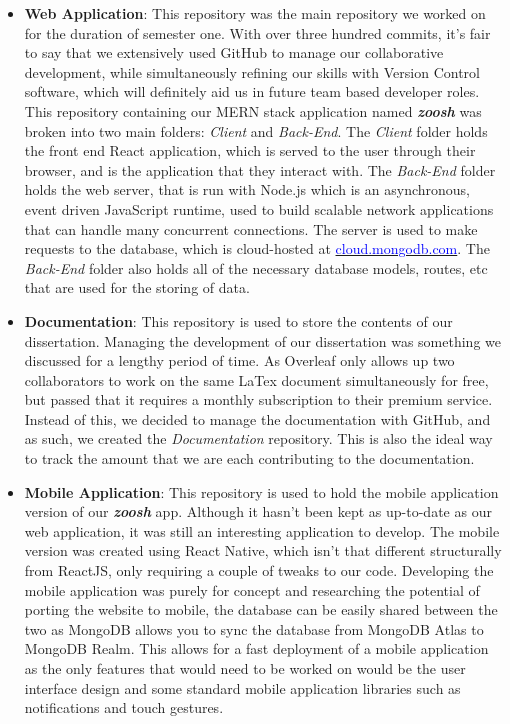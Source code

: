 \begin{itemize}
    \item \textbf{Web Application}: This repository was the main repository we worked on for the duration of semester one. With over three hundred commits, it's fair to say that we extensively used GitHub to manage our collaborative development, while simultaneously refining our skills with Version Control software, which will definitely aid us in future team based developer roles. This repository containing our MERN stack application named \textit{\textbf{zoosh}} was broken into two main folders: \textit{Client} and \textit{Back-End}. The \textit{Client} folder holds the front end React application, which is served to the user through their browser, and is the application that they interact with. The \textit{Back-End} folder holds the web server, that is run with Node.js which is an asynchronous, event driven JavaScript runtime, used to build scalable network applications that can handle many concurrent connections. The server is used to make requests to the database, which is cloud-hosted at \href{https://cloud.mongodb.com/v2/5e930ffe4cdf590dd97ad867#clusters}{\textcolor{blue}{cloud.mongodb.com}}. The \textit{Back-End} folder also holds all of the necessary database models, routes, etc that are used for the storing of data.
    \item \textbf{Documentation}: This repository is used to store the contents of our dissertation. Managing the development of our dissertation was something we discussed for a lengthy period of time. As Overleaf only allows up two collaborators to work on the same LaTex document simultaneously for free, but passed that it requires a monthly subscription to their premium service. Instead of this, we decided to manage the documentation with GitHub, and as such, we created the \textit{Documentation} repository. This is also the ideal way to track the amount that we are each contributing to the documentation.
    \item \textbf{Mobile Application}: This repository is used to hold the mobile application version of our \textit{\textbf{zoosh}} app. Although it hasn't been kept as up-to-date as our web application, it was still an interesting application to develop. The mobile version was created using React Native, which isn't that different structurally from ReactJS, only requiring a couple of tweaks to our code. Developing the mobile application was purely for concept and researching the potential of porting the website to mobile, the database can be easily shared between the two as MongoDB allows you to sync the database from MongoDB Atlas to MongoDB Realm. This allows for a fast deployment of a mobile application as the only features that would need to be worked on would be the user interface design and some standard mobile application libraries such as notifications and touch gestures.
\end{itemize}


